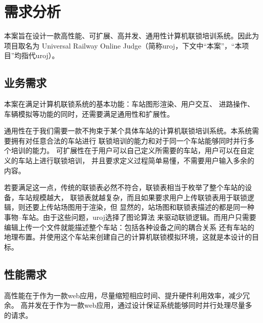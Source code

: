 \section{需求分析}
本案旨在设计一款高性能、可扩展、高并发、通用性计算机联锁培训系统。因此为项目取名为
Universal Railway Online Judge（简称uroj，下文中“本案”，“本项目”均指代uroj）。

\subsection{业务需求}
本案在满足计算机联锁系统的基本功能：车站图形渲染、用户交互、
进路操作、车辆模拟等功能的同时，还需要满足通用性和扩展性。

通用性在于我们需要一款不拘束于某个具体车站的计算机联锁培训系统。本系统需要拥有对任意合法的车站进行
联锁培训的能力和对于同一个车站能够同时并行多个培训的能力。
可扩展性在于用户可以自己定义所需要的车站，用户可以在自定义的车站上进行联锁培训，
并且要求定义过程简单易懂，不需要用户输入多余的内容。

若要满足这一点，传统的联锁表必然不符合，联锁表相当于枚举了整个车站的设备，车站规模越大，
联锁表就越复杂，而且如果要求用户上传联锁表用于联锁逻辑，则还要上传站场图用于渲染，但
显然的，站场图和联锁表描述的都是同一种事物--车站。由于这些问题，uroj选择了图论算法
来驱动联锁逻辑。而用户只需要编辑上传一个文件就能描述整个车站：包括各种设备之间的耦合关系
还有车站的地理布置。并使用这个车站来创建自己的计算机联锁模拟环境，这就是本设计的目标。


\subsection{性能需求}

高性能在于作为一款web应用，尽量缩短相应时间、提升硬件利用效率，减少冗余。
高并发在于作为一款web应用，通过设计保证系统能够同时并行处理尽量多的请求。